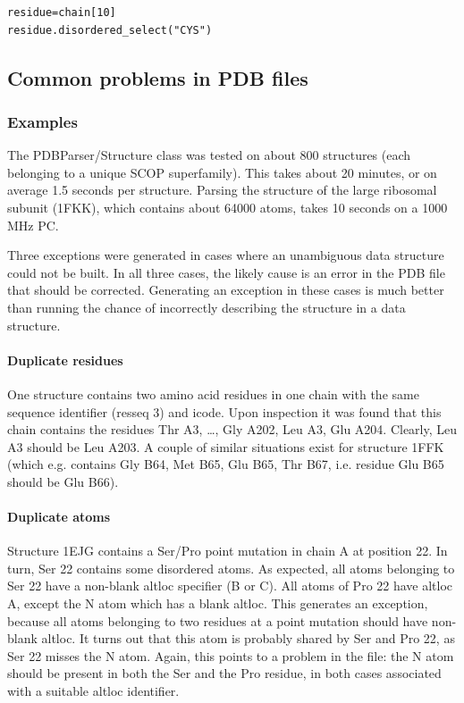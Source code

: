 \documentclass{report}
\begin{document}
\begin{verbatim}
residue=chain[10]
residue.disordered_select("CYS")
\end{verbatim}

\subsection{Common problems in PDB files}


\subsubsection{Examples\label{problem structures}}

The PDBParser/Structure class was tested on about 800 structures (each belonging
to a unique SCOP superfamily). This takes about 20 minutes, or on average 1.5
seconds per structure. Parsing the structure of the large ribosomal subunit
(1FKK), which contains about 64000 atoms, takes 10 seconds on a 1000 MHz PC.

Three exceptions were generated in cases where an unambiguous data structure
could not be built. In all three cases, the likely cause is an error in the
PDB file that should be corrected. Generating an exception in these cases 
is much better than running the chance of incorrectly describing
the structure in a data structure. 


\paragraph{Duplicate residues}

One structure contains two amino acid residues in one chain with the same sequence
identifier (resseq 3) and icode. Upon inspection it was found that this chain
contains the residues Thr A3, \ldots{}, Gly A202, Leu A3, Glu A204. Clearly,
Leu A3 should be Leu A203. A couple of similar situations exist for structure
1FFK (which e.g. contains Gly B64, Met B65, Glu B65, Thr B67, i.e. residue Glu
B65 should be Glu B66). 


\paragraph{Duplicate atoms}

Structure 1EJG contains a Ser/Pro point mutation in chain A at position 22.
In turn, Ser 22 contains some disordered atoms. As expected, all atoms belonging
to Ser 22 have a non-blank altloc specifier (B or C). All atoms of Pro 22 have
altloc A, except the N atom which has a blank altloc. This generates an exception,
because all atoms belonging to two residues at a point mutation should have
non-blank altloc. It turns out that this atom is probably shared by Ser and
Pro 22, as Ser 22 misses the N atom. Again, this points to a problem in the
file: the N atom should be present in both the Ser and the Pro residue, in both
cases associated with a suitable altloc identifier.
\end{document}
